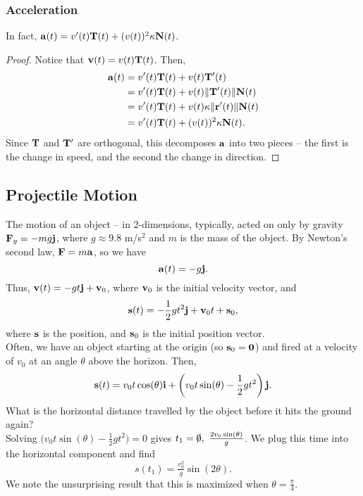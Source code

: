 \subsubsection{Acceleration}

In fact, \(\mathbf{a}(t) = v'(t)\mathbf{T}(t) + (v(t))^{2}\kappa\mathbf{N}(t)\).

\begin{proof}
    Notice that \(\mathbf{v}(t) = v(t)\mathbf{T}(t)\). Then,
    \begin{align*}
        \mathbf{a}(t) &= v'(t)\mathbf{T}(t) + v(t)\mathbf{T}'(t) \\
        &= v'(t)\mathbf{T}(t) + v(t)\|\mathbf{T}'(t)\|\mathbf{N}(t) \\
        &= v'(t)\mathbf{T}(t) + v(t)\kappa\|\mathbf{r}'(t)\|\mathbf{N}(t) \\
        &= v'(t)\mathbf{T}(t) + (v(t))^{2}\kappa\mathbf{N}(t).
    \end{align*}
    Since \(\mathbf{T}\) and \(\mathbf{T}'\) are orthogonal, this decomposes \(\mathbf{a}\) into two pieces -- the first is the change in speed, and the second the change in direction.
\end{proof}

\subsection{Projectile Motion}

The motion of an object -- in 2-dimensions, typically, acted on only by gravity \(\mathbf{F}_{g} = -mg\mathbf{j}\), where \(g \approx 9.8\) m/s\(^{2}\) and \(m\) is the mass of the object. By Newton's second law, \(\mathbf{F} = m\mathbf{a}\), so we have 
\[
    \mathbf{a}(t) = - g\mathbf{j}.
\]
Thus, \(\mathbf{v}(t) = -gt\mathbf{j} + \mathbf{v}_{0}\), where \(\mathbf{v}_{0}\) is the initial velocity vector, and
\[
    \mathbf{s}(t) = -\frac{1}{2}gt^{2}\mathbf{j} + \mathbf{v}_{0}t + \mathbf{s}_{0},
\]
where \(\mathbf{s}\) is the position, and \(\mathbf{s}_{0}\) is the initial position vector. \\

Often, we have an object starting at the origin (so \(\mathbf{s}_{0} = \mathbf{0}\)) and fired at a velocity of \(v_{0}\) at an angle \(\theta\) above the horizon. Then,
\[  
    \mathbf{s}(t) = v_{0}t\cos(\theta)\mathbf{i} + \left(v_{0}t\sin(\theta) - \frac{1}{2}gt^{2}\right)\mathbf{j}.
\]
What is the horizontal distance travelled by the object before it hits the ground again? \\

Solving \(\bigl(v_{0}t\sin(\theta) - \frac{1}{2}gt^{2}\bigr) = 0\) gives \(t_{1} = \slashed{0}, \ \frac{2v_{0}\sin(\theta)}{g}\). We plug this time into the horizontal component and find 
\[
    s(t_{1}) = \tfrac{v_{0}^{2}}{g}\sin(2\theta).
\]
We note the unsurprising result that this is maximized when \(\theta = \frac{\pi}{4}\).

